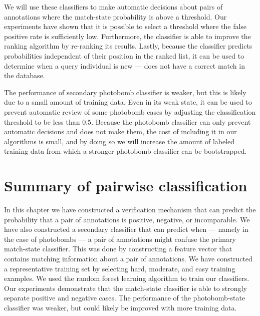         We will use these classifiers to make automatic decisions about pairs of annotations where the
          match-state probability is above a threshold.
        Our experiments have shown that it is possible to select a threshold where the false positive rate is
          sufficiently low.
        Furthermore, the classifier is able to improve the ranking algorithm by re-ranking its results.
        Lastly, because the classifier predicts probabilities independent of their position in the ranked list,
          it can be used to determine when a query individual is new --- \ie{} does not have a correct match in the
          database.

        The performance of secondary photobomb classifier is weaker, but this is likely due to a small amount of
          training data.
        Even in its weak state, it can be used to prevent automatic review of some photobomb cases by adjusting
          the classification threshold to be less than $0.5$.
        Because the photobomb classifier can only prevent automatic decisions and does not make them, the cost of
          including it in our algorithms is small, and by doing so we will increase the amount of labeled training
          data from which a stronger photobomb classifier can be bootstrapped.


\section{Summary of pairwise classification}\label{sec:pairconclusion}

    In this chapter we have constructed a verification mechanism that can predict the probability that a pair of
      annotations is positive, negative, or incomparable.
    We have also constructed a secondary classifier that can predict when --- namely in the case of photobombs
      --- a pair of annotations might confuse the primary match-state classifier.
    This was done by constructing a feature vector that contains matching information about a pair of
      annotations.
    We have constructed a representative training set by selecting hard, moderate, and easy training examples.
    We used the random forest learning algorithm to train our classifiers.
    Our experiments demonstrate that the match-state classifier is able to strongly separate positive and
      negative cases.
    The performance of the photobomb-state classifier was weaker, but could likely be improved with more training
      data.

